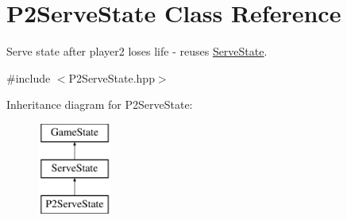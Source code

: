 \hypertarget{class_p2_serve_state}{}\section{P2\+Serve\+State Class Reference}
\label{class_p2_serve_state}


Serve state after player2 loses life -\/ reuses \mbox{\hyperlink{class_serve_state}{Serve\+State}}.  




{\ttfamily \#include $<$P2\+Serve\+State.\+hpp$>$}

Inheritance diagram for P2\+Serve\+State\+:\begin{figure}[H]
\begin{center}
\leavevmode
\includegraphics[height=3.000000cm]{class_p2_serve_state}
\end{center}
\end{figure}
